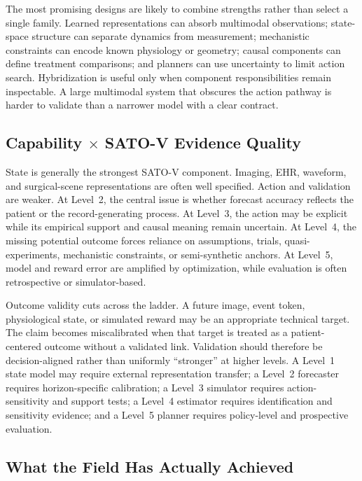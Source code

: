 The most promising designs are likely to combine strengths rather than select a single family. Learned representations can absorb multimodal observations; state-space structure can separate dynamics from measurement; mechanistic constraints can encode known physiology or geometry; causal components can define treatment comparisons; and planners can use uncertainty to limit action search. Hybridization is useful only when component responsibilities remain inspectable. A large multimodal system that obscures the action pathway is harder to validate than a narrower model with a clear contract.

\subsection{Capability $\times$ SATO-V Evidence Quality}

State is generally the strongest SATO-V component. Imaging, EHR, waveform, and surgical-scene representations are often well specified. Action and validation are weaker. At Level~2, the central issue is whether forecast accuracy reflects the patient or the record-generating process. At Level~3, the action may be explicit while its empirical support and causal meaning remain uncertain. At Level~4, the missing potential outcome forces reliance on assumptions, trials, quasi-experiments, mechanistic constraints, or semi-synthetic anchors. At Level~5, model and reward error are amplified by optimization, while evaluation is often retrospective or simulator-based.

Outcome validity cuts across the ladder. A future image, event token, physiological state, or simulated reward may be an appropriate technical target. The claim becomes miscalibrated when that target is treated as a patient-centered outcome without a validated link. Validation should therefore be decision-aligned rather than uniformly ``stronger'' at higher levels. A Level~1 state model may require external representation transfer; a Level~2 forecaster requires horizon-specific calibration; a Level~3 simulator requires action-sensitivity and support tests; a Level~4 estimator requires identification and sensitivity evidence; and a Level~5 planner requires policy-level and prospective evaluation.

\subsection{What the Field Has Actually Achieved}

